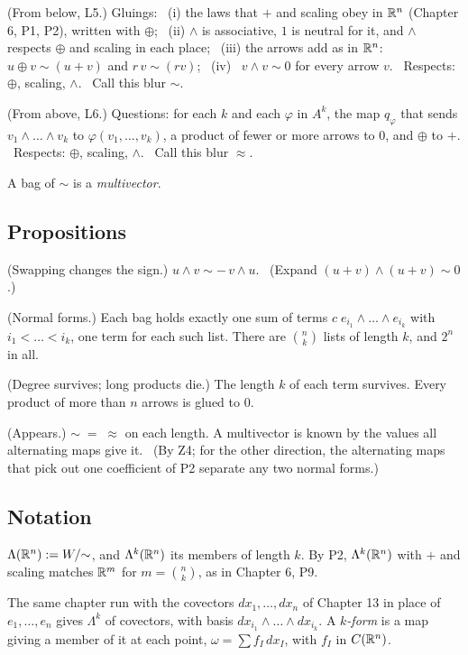 \begin{lines}
\item[\lab{B1}] (From below, L5.) Gluings: \ (i) the laws that $+$ and scaling obey in $\mathbb{R}^n$ (Chapter 6, P1, P2), written with $\oplus$; \ (ii) $\wedge$ is associative, $1$ is neutral for it, and $\wedge$ respects $\oplus$ and scaling in each place; \ (iii) the arrows add as in $\mathbb{R}^n$: $u \oplus v \sim (u + v)$ and $r\,v \sim (rv)$; \ (iv) \ $v \wedge v \sim 0$ for every arrow $v$. \ Respects: $\oplus$, scaling, $\wedge$. \ Call this blur $\sim$.
\item[\lab{B2}] (From above, L6.) Questions: for each $k$ and each $\varphi$ in $A^k$, the map $q_\varphi$ that sends $v_1 \wedge \dots \wedge v_k$ to $\varphi(v_1, \dots, v_k)$, a product of fewer or more arrows to $0$, and $\oplus$ to $+$. \ Respects: $\oplus$, scaling, $\wedge$. \ Call this blur $\approx$.
\item[] A bag of $\sim$ is a \emph{multivector}.
\end{lines}

\subsection*{Propositions}

\begin{lines}
\item[\lab{P1}] (Swapping changes the sign.) $u \wedge v \sim -\,v \wedge u$. \ (Expand $(u + v) \wedge (u + v) \sim 0$.)
\item[\lab{P2}] (Normal forms.) Each bag holds exactly one sum of terms $c\; e_{i_1} \wedge \dots \wedge e_{i_k}$ with $i_1 < \dots < i_k$, one term for each such list. There are $\binom{n}{k}$ lists of length $k$, and $2^n$ in all.
\item[\lab{P3}] (Degree survives; long products die.) The length $k$ of each term survives. Every product of more than $n$ arrows is glued to $0$.
\item[\lab{P4}] (Appears.) $\sim \;=\; \approx$ on each length. A multivector is known by the values all alternating maps give it. \ (By Z4; for the other direction, the alternating maps that pick out one coefficient of P2 separate any two normal forms.)
\end{lines}

\subsection*{Notation}

\begin{lines}
\item[\lab{N1}] $\Lambda(\mathbb{R}^n) := W/{\sim}$, and $\Lambda^k(\mathbb{R}^n)$ its members of length $k$. By P2, $\Lambda^k(\mathbb{R}^n)$ with $+$ and scaling matches $\mathbb{R}^m$ for $m = \binom{n}{k}$, as in Chapter 6, P9.
\item[\lab{N2}] The same chapter run with the covectors $dx_1, \dots, dx_n$ of Chapter 13 in place of $e_1, \dots, e_n$ gives $\Lambda^k$ of covectors, with basis $dx_{i_1} \wedge \dots \wedge dx_{i_k}$. A \emph{$k$-form} is a map giving a member of it at each point, $\omega = \sum f_I\, dx_I$, with $f_I$ in $C(\mathbb{R}^n)$.
\end{lines}

